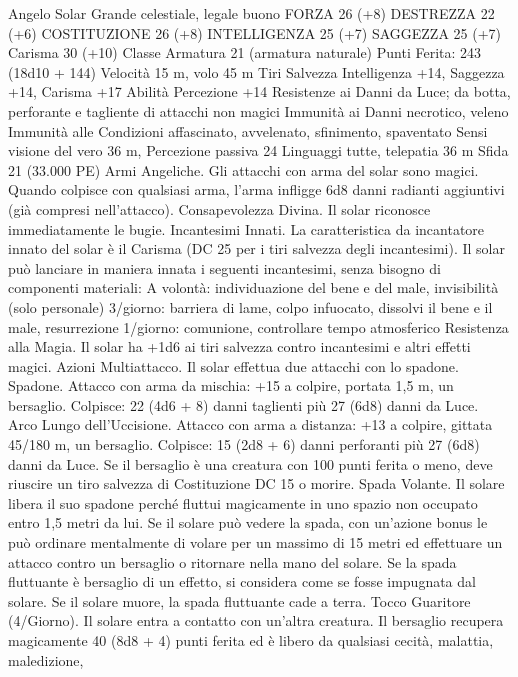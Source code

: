 \begin{multicols}{2}
Angelo Solar
Grande celestiale, legale buono
FORZA 26 (+8)
DESTREZZA 22 (+6)
COSTITUZIONE 26 (+8)
INTELLIGENZA 25 (+7)
SAGGEZZA 25 (+7)
Carisma 30 (+10)
Classe Armatura 21 (armatura naturale)
\hspace*{0pt}\hfill{Punti Ferita}: 243 (18d10 + 144)
Velocità 15 m, volo 45 m
Tiri Salvezza Intelligenza +14, Saggezza +14, Carisma +17
Abilità Percezione +14
Resistenze ai Danni da Luce; da botta, perforante e tagliente
di attacchi non magici
Immunità ai Danni necrotico, veleno
Immunità alle Condizioni affascinato, avvelenato, sfinimento,
spaventato
Sensi visione del vero 36 m, Percezione passiva 24
Linguaggi tutte, telepatia 36 m
Sfida 21 (33.000 PE)
Armi Angeliche. Gli attacchi con arma del solar sono magici.
Quando colpisce con qualsiasi arma, l’arma infligge 6d8 danni
radianti aggiuntivi (già compresi nell’attacco).
Consapevolezza Divina. Il solar riconosce immediatamente le
bugie.
Incantesimi Innati. La caratteristica da incantatore innato del
solar è il Carisma (DC 25 per i tiri salvezza degli incantesimi). Il
solar può lanciare in maniera innata i seguenti incantesimi, senza
bisogno di componenti materiali:
A volontà: individuazione del bene e del male, invisibilità (solo
personale)
3/giorno: barriera di lame, colpo infuocato, dissolvi il bene e il
male, resurrezione
1/giorno: comunione, controllare tempo atmosferico
Resistenza alla Magia. Il solar ha +1d6 ai tiri salvezza
contro incantesimi e altri effetti magici.
Azioni
Multiattacco. Il solar effettua due attacchi con lo spadone.
Spadone. Attacco con arma da mischia: +15 a colpire, portata
1,5 m, un bersaglio.
Colpisce: 22 (4d6 + 8) danni taglienti più 27 (6d8) danni da Luce.
Arco Lungo dell’Uccisione. Attacco con arma a distanza: +13 a
colpire, gittata 45/180 m, un bersaglio.
Colpisce: 15 (2d8 + 6) danni perforanti più 27 (6d8) danni da Luce.
Se il bersaglio è una creatura con 100 punti ferita o meno, deve
riuscire un tiro salvezza di Costituzione DC 15 o morire.
Spada Volante. Il solare libera il suo spadone perché fluttui
magicamente in uno spazio non occupato entro 1,5 metri da lui.
Se il solare può vedere la spada, con un’azione bonus le può
ordinare mentalmente di volare per un massimo di 15 metri ed
effettuare un attacco contro un bersaglio o ritornare nella mano
del solare. Se la spada fluttuante è bersaglio di un effetto, si
considera come se fosse impugnata dal solare. Se il solare muore,
la spada fluttuante cade a terra.
Tocco Guaritore (4/Giorno). Il solare entra a contatto con
un’altra creatura. Il bersaglio recupera magicamente 40 (8d8 + 4)
punti ferita ed è libero da qualsiasi cecità, malattia, maledizione,

\end{multicols}
